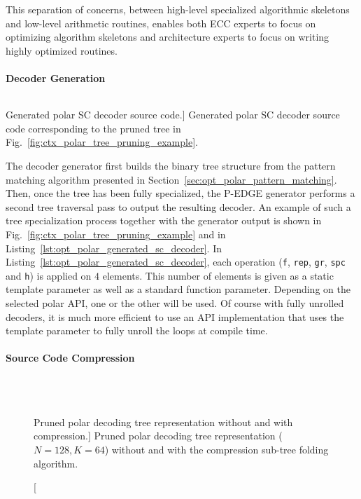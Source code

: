 This separation of concerns, between high-level specialized algorithmic
skeletons and low-level arithmetic routines, enables both ECC experts to focus
on optimizing algorithm skeletons and architecture experts to focus on writing
highly optimized routines.

\paragraph{Decoder Generation}

\begin{listing}[htp]
  \inputminted[frame=lines,linenos]{C++}{\curChapter/src/polar/generated_sc_decoder.cpp}
  \caption
    [Generated polar SC decoder source code.]
    {Generated polar SC decoder source code corresponding to the pruned tree in
     Fig.~\ref{fig:ctx_polar_tree_pruning_example}.}
  \label{lst:opt_polar_generated_sc_decoder}
\end{listing}

The decoder generator first builds the binary tree structure from the pattern
matching algorithm presented in Section~\ref{sec:opt_polar_pattern_matching}.
Then, once the tree has been fully specialized, the P-EDGE generator performs a
second tree traversal pass to output the resulting decoder. An example of such a
tree specialization process together with the generator output is shown in
Fig.~\ref{fig:ctx_polar_tree_pruning_example} and in
Listing~\ref{lst:opt_polar_generated_sc_decoder}. In
Listing~\ref{lst:opt_polar_generated_sc_decoder}, each operation (\verb|f|,
\verb|rep|, \verb|gr|, \verb|spc| and \verb|h|) is applied on $4$ elements. This
number of elements is given as a static template parameter as well as a standard
function parameter. Depending on the selected polar API, one or the other will
be used. Of course with fully unrolled decoders, it is much more efficient to
use an API implementation that uses the template parameter to fully unroll the
loops at compile time.

\paragraph{Source Code Compression}
\label{sec:opt_polar_sc_compression}

\begin{figure}[htp]
  \centering
  \\
  \\
  \caption
    [Pruned polar decoding tree representation without and with compression.]
    {Pruned polar decoding tree representation ($N = 128, K = 64$) without
    and with the compression sub-tree folding algorithm.}
  \label{fig:opt_polar_sc_gen_compression}
\end{figure}


